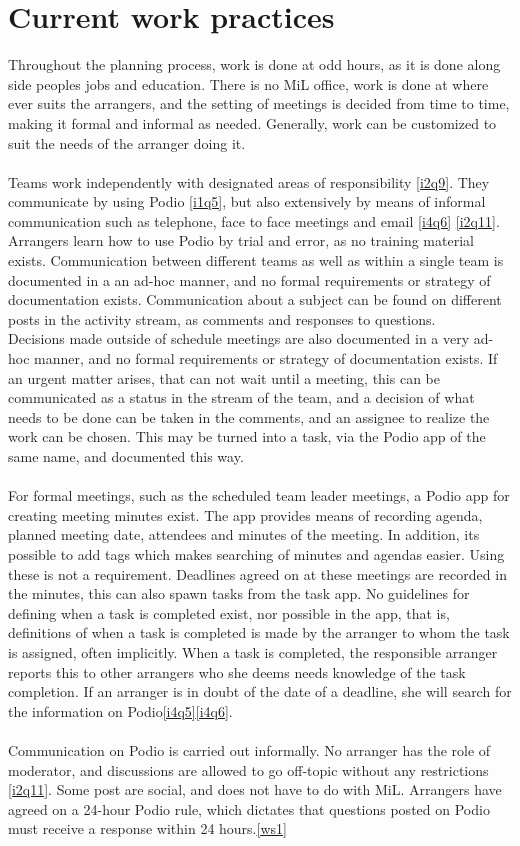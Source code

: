 \section{Current work practices}
Throughout the planning process, work is done at odd hours, as it is done along side peoples jobs and education. There is no MiL office, work is done at where ever suits the arrangers, and the setting of meetings is decided from time to time, making it formal and informal as needed. Generally, work can be customized to suit the needs of the arranger doing it.
\\ \\
Teams work independently with designated areas of responsibility \ref{i2q9}. They communicate by using Podio \ref{i1q5}, but also extensively by means of informal communication such as telephone, face to face meetings and email \ref{i4q6} \ref{i2q11}. Arrangers learn how to use Podio by trial and error, as no training material exists. Communication between different teams as well as within a single team is documented in a an ad-hoc manner, and no formal requirements or strategy of documentation exists. Communication about a subject can be found on different posts in the activity stream, as comments and responses to questions. 
\\
Decisions made outside of schedule meetings are also documented in a very ad-hoc manner, and no formal requirements or strategy of documentation exists. If an urgent matter arises, that can not wait until a meeting, this can be communicated as a status in the stream of the team, and a decision of what needs to be done can be taken in the comments, and an assignee to realize the work can be chosen. This may be turned into a task, via the Podio app of the same name, and documented this way.
\\ \\
For formal meetings, such as the scheduled team leader meetings, a Podio app for creating meeting minutes exist. The app provides means of recording agenda, planned meeting date, attendees and minutes of the meeting. In addition, its possible to add tags which makes searching of minutes and agendas easier. Using these is not a requirement. Deadlines agreed on at these meetings are recorded in the minutes, this can also spawn tasks from the task app. No guidelines for defining when a task is completed exist, nor possible in the app, that is, definitions of when a task is completed is made by the arranger to whom the task is assigned, often implicitly. When a task is completed, the responsible arranger reports this to other arrangers who she deems needs knowledge of the task completion. If an arranger is in doubt of the date of a deadline, she will search for the information on Podio\ref{i4q5}\ref{i4q6}.
\\ \\
Communication on Podio is carried out informally. No arranger has the role of moderator, and discussions are allowed to go off-topic without any restrictions \ref{i2q11}. Some post are social, and does not have to do with MiL. Arrangers have agreed on a 24-hour Podio rule, which dictates that questions posted on Podio must receive a response within 24 hours.\ref{ws1}


